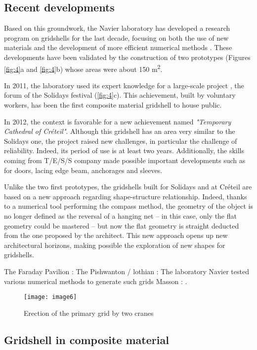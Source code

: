 \subsection{Recent developments}
Based on this groundwork, the Navier laboratory has developed a research program on gridshells for the last decade, focusing on both the use of new materials and the development of more efficient numerical methods \cite{Douthe2007}. These developments have been validated by the construction of two prototypes (Figures \ref{fig:4}a and \ref{fig:4}b) whose areas were about 150 m\textsuperscript{2}.


In 2011, the laboratory used its expert knowledge for a large-scale project \cite{Baverel2012}, the forum of the Solidays festival (\autoref{fig:4}c). This achievement, built by voluntary workers, has been the first composite material gridshell to house public.

In 2012, the context is favorable for a new achievement named \emph{"Temporary Cathedral of Créteil"}. Although this gridshell has an area very similar to the Solidays one, the project raised new challenges, in particular the challenge of reliability. Indeed, its period of use is at least two years. Additionally, the skills coming from T/E/S/S company made possible important developments such as for doors, lacing edge beam, anchorages and sleeves.

Unlike the two first prototypes, the gridshells built for Solidays and at Créteil are based on a new approach regarding shape-structure relationship. Indeed, thanks to a numerical tool performing the compass method, the geometry of the object is no longer defined as the reversal of a hanging net – in this case, only the flat geometry could be mastered \cite{Addis2013} – but now the flat geometry is straight deducted from the one proposed by the architect.
This new approach opens up new architectural horizons, making possible the exploration of new shapes for gridshells.

The Faraday Pavilion : \cite{Nicholas2013}
The Pishwanton / lothian : \cite{Pishwanton2003}
The laboratory Navier tested various numerical methods to generate such grids \cite{Bouhaya2009}
Masson :  \cite{Masson2017}.
\begin{figure}[t]
	\centering
		\texttt{[image: image6]}
	\caption{Erection of the primary grid by two cranes}
	\label{fig:5}
\end{figure}


\subsection{Gridshell in composite material}

